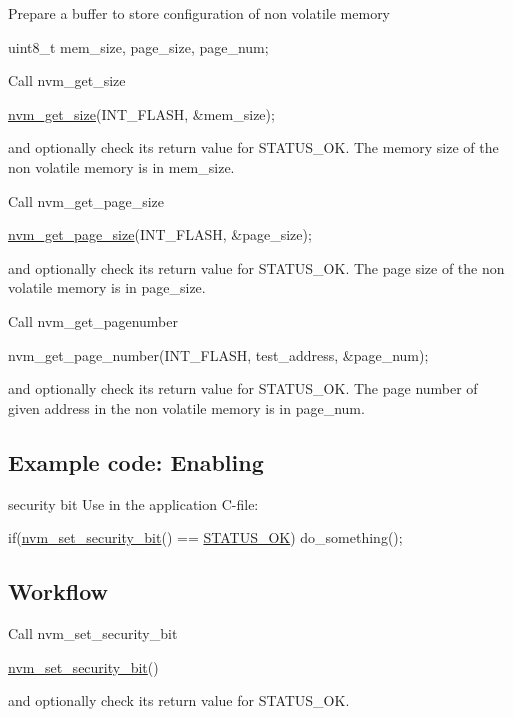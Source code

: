 \begin{DoxyEnumerate}
\item Prepare a buffer to store configuration of non volatile memory 
\begin{DoxyCode}
 uint8\_t mem\_size, page\_size, page\_num; 
\end{DoxyCode}

\item Call nvm\-\_\-get\-\_\-size 
\begin{DoxyCode}
 \hyperlink{xmega__nvm_8c_ad90ba5cf40374577ef525365bbc86641}{nvm\_get\_size}(INT\_FLASH, &mem\_size); 
\end{DoxyCode}
 and optionally check its return value for S\-T\-A\-T\-U\-S\-\_\-\-O\-K. The memory size of the non volatile memory is in mem\-\_\-size.
\item Call nvm\-\_\-get\-\_\-page\-\_\-size 
\begin{DoxyCode}
 \hyperlink{xmega__nvm_8c_a784427385b7243e8d69dcb52933116d8}{nvm\_get\_page\_size}(INT\_FLASH, &page\_size);
\end{DoxyCode}
 and optionally check its return value for S\-T\-A\-T\-U\-S\-\_\-\-O\-K. The page size of the non volatile memory is in page\-\_\-size.
\item Call nvm\-\_\-get\-\_\-pagenumber 
\begin{DoxyCode}
 nvm\_get\_page\_number(INT\_FLASH, test\_address,
         &page\_num); 
\end{DoxyCode}
 and optionally check its return value for S\-T\-A\-T\-U\-S\-\_\-\-O\-K. The page number of given address in the non volatile memory is in page\-\_\-num.
\end{DoxyEnumerate}\hypertarget{common_nvm_quickstart_nvm_basic_use_case_usage_code_locking}{}\subsection{Example code\-: Enabling}\label{common_nvm_quickstart_nvm_basic_use_case_usage_code_locking}
security bit Use in the application C-\/file\-: 
\begin{DoxyCode}
        \textcolor{keywordflow}{if}(\hyperlink{xmega__nvm_8c_af15d68188f29bee24b7cdc19e835e293}{nvm\_set\_security\_bit}() == \hyperlink{group__group__xmega__utils__status__codes_gga751c892e5a46b8e7d282085a5a5bf151a7e4a42e3b6dd63708c64cf3db6f69566}{STATUS\_OK})
          do\_something();
\end{DoxyCode}
\hypertarget{common_nvm_quickstart_nvm_basic_use_case_usage_flow}{}\subsection{Workflow}\label{common_nvm_quickstart_nvm_basic_use_case_usage_flow}

\begin{DoxyEnumerate}
\item Call nvm\-\_\-set\-\_\-security\-\_\-bit 
\begin{DoxyCode}
 \hyperlink{xmega__nvm_8c_af15d68188f29bee24b7cdc19e835e293}{nvm\_set\_security\_bit}() 
\end{DoxyCode}
 and optionally check its return value for S\-T\-A\-T\-U\-S\-\_\-\-O\-K. 
\end{DoxyEnumerate}